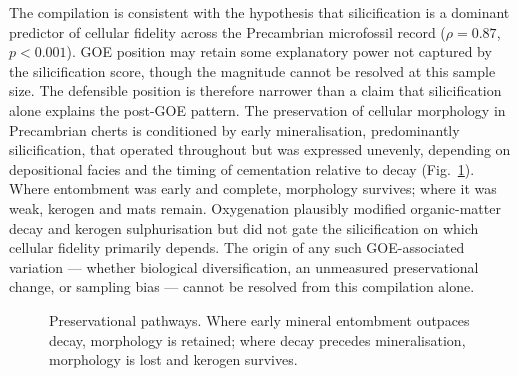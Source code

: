\documentclass[11pt]{article}
\begin{document}
The compilation is consistent with the hypothesis that silicification is a dominant predictor of
cellular fidelity across the Precambrian microfossil record ($\rho = 0.87$, $p < 0.001$). GOE
position may retain some explanatory power not captured by the silicification score, though the
magnitude cannot be resolved at this sample size. The defensible position is therefore narrower than a
claim that silicification alone explains the post-GOE pattern. The preservation of cellular morphology
in Precambrian cherts is conditioned by early mineralisation, predominantly silicification, that
operated throughout but was expressed unevenly, depending on depositional facies and the timing of
cementation relative to decay (Fig.~\ref{fig:model}). Where entombment was early and complete,
morphology survives; where it was weak, kerogen and mats remain. Oxygenation plausibly modified
organic-matter decay and kerogen sulphurisation \citep{Lepot2009,Decraene2021} but did not gate the
silicification on which cellular fidelity primarily depends. The origin of any such GOE-associated
variation --- whether biological diversification, an unmeasured preservational change, or sampling
bias --- cannot be resolved from this compilation alone.

\begin{figure}[t]
\centering
{}
\caption{Preservational pathways. Where early mineral entombment outpaces decay, morphology is
retained; where decay precedes mineralisation, morphology is lost and kerogen survives.}
\label{fig:model}
\end{figure}
\end{document}
